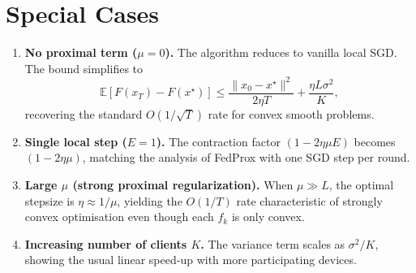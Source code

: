 \documentclass{article}
\newcommand{\E}{\mathbb{E}}
\begin{document}
\section*{Special Cases}
\begin{enumerate}[label=(\alph*)]
\item \textbf{No proximal term ($\mu=0$).}  
The algorithm reduces to vanilla local SGD.  The bound simplifies to
\[
\E[F(x_T)-F(x^{\star})]\le\frac{\|x_0-x^{\star}\|^{2}}{2\eta T}
+\frac{\eta L\sigma^{2}}{K},
\]
recovering the standard $O(1/\sqrt{T})$ rate for convex smooth problems.

\item \textbf{Single local step ($E=1$).}  
The contraction factor $(1-2\eta\mu E)$ becomes $(1-2\eta\mu)$, matching the analysis
of FedProx with one SGD step per round.

\item \textbf{Large $\mu$ (strong proximal regularization).}  
When $\mu\gg L$, the optimal stepsize is $\eta\approx 1/\mu$, yielding the $O(1/T)$
rate characteristic of strongly convex optimisation even though each $f_k$ is only convex.

\item \textbf{Increasing number of clients $K$.}  
The variance term scales as $\sigma^{2}/K$, showing the usual linear speed‑up with
more participating devices.
\end{enumerate}
\end{document}
